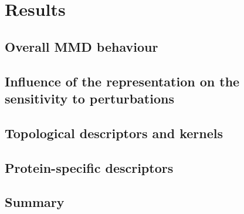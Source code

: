 \chapter{Results}

\section{Overall MMD behaviour}


\section{Influence of the representation on the sensitivity to perturbations}


\section{Topological descriptors and kernels}

\section{Protein-specific descriptors}










\section{Summary}
